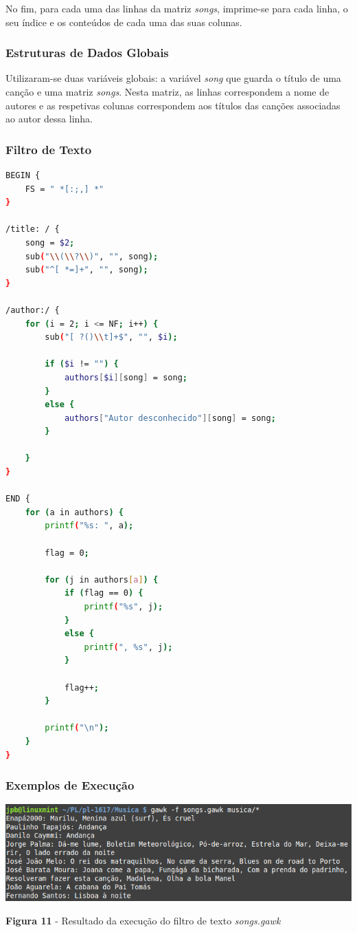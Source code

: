 \documentclass{article}
\begin{document}
No fim, para cada uma das linhas da matriz \emph{songs}, imprime-se para cada linha, o seu índice e os conteúdos de cada uma das suas colunas.

\subsubsection{Estruturas de Dados Globais}

Utilizaram-se duas variáveis globais: a variável \emph{song} que guarda o título de uma canção e uma matriz \emph{songs}. Nesta matriz, as linhas correspondem a nome de autores e as respetivas colunas correspondem aos títulos das canções associadas ao autor dessa linha.

\newpage
\subsubsection{Filtro de Texto}

\begin{lstlisting}[language=bash]
BEGIN {
	FS = " *[:;,] *"
}

/title: / {
	song = $2;
	sub("\\(\\?\\)", "", song);
	sub("^[ *=]+", "", song);
}

/author:/ {
	for (i = 2; i <= NF; i++) {
		sub("[ ?()\\t]+$", "", $i);

		if ($i != "") {
			authors[$i][song] = song;
		}
		else {
			authors["Autor desconhecido"][song] = song;
		}

	}
}

END {
	for (a in authors) {
		printf("%s: ", a);

		flag = 0;		

		for (j in authors[a]) {
			if (flag == 0) {
				printf("%s", j);
			}
			else {
				printf(", %s", j);
			} 

			flag++;
		}

		printf("\n");
	}
}
\end{lstlisting}

\subsubsection{Exemplos de Execução}

\begin{center}
    \includegraphics[scale=1]{imagens/songs}
    \caption{\textbf{Figura 11} - Resultado da execução do filtro de texto \emph{songs.gawk}}
\end{center}
\end{document}
